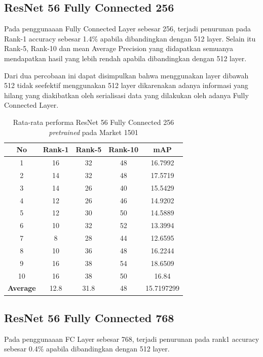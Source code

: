 \subsection{ResNet 56 Fully Connected 256}
\vspace{1ex}
Pada penggunaaan Fully Connected Layer sebesar 256, terjadi penurunan pada Rank-1 accuracy sebesar 1.4\% apabila dibandingkan dengan 512 layer. Selain itu Rank-5, Rank-10 dan mean Average Precision yang didapatkan semuanya mendapatkan hasil yang lebih rendah apabila dibandingkan dengan 512 layer. 

Dari dua percobaan ini dapat disimpulkan bahwa menggunakan layer dibawah 512 tidak seefektif menggunakan 512 layer dikarenakan adanya informasi yang hilang yang diakibatkan oleh serialisasi data yang dilakukan oleh adanya Fully Connected Layer.

\begin{longtable}{|c|c|c|c|c|}
	\caption{Rata-rata performa ResNet 56 Fully Connected 256 \textit{pretrained} pada Market 1501}
	\label{tabel: 11}\\
	\hline
	\rowcolor[HTML]{C0C0C0}
	\textbf{No} &\textbf{Rank-1} & \textbf{Rank-5} & \textbf{Rank-10} & \textbf{mAP} \\
	\hline
	1 &16 &32 &48 &16.7992 \\
	2 &14 &32 &48 &17.5719 \\
	3 &14 &26 &40 &15.5429 \\
	4 &12 &26 &46 &14.9202 \\
	5 &12 &30 &50 &14.5889 \\
	6 &10 &32 &52 &13.3994 \\
	7 &8 &28 &44 &12.6595 \\
	8 &10 &36 &48 &16.2244 \\
	9 &16 &38 &54 &18.6509 \\
	10 &16 &38 &50 &16.84 \\
	\hline
	\textbf{Average} & 12.8 & 31.8 & 48 &15.7197299 \\
	\hline
\end{longtable}

\subsection{ResNet 56 Fully Connected 768}
Pada penggunaaan FC Layer sebesar 768, terjadi penurunan pada rank1 accuracy sebesar 0.4\% apabila dibandingkan dengan 512 layer.

